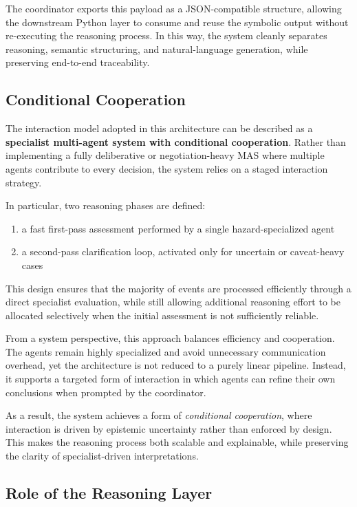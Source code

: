 \documentclass[12pt]{article}
\begin{document}
The coordinator exports this payload as a JSON-compatible structure, allowing the downstream Python layer to consume and reuse the symbolic output without re-executing the reasoning process. In this way, the system cleanly separates reasoning, semantic structuring, and natural-language generation, while preserving end-to-end traceability.

\subsection{Conditional Cooperation}

The interaction model adopted in this architecture can be described as a \textbf{specialist multi-agent system with conditional cooperation}. Rather than implementing a fully deliberative or negotiation-heavy MAS where multiple agents contribute to every decision, the system relies on a staged interaction strategy.

In particular, two reasoning phases are defined:

\begin{enumerate}
\item a fast first-pass assessment performed by a single hazard-specialized agent
\item a second-pass clarification loop, activated only for uncertain or caveat-heavy cases
\end{enumerate}

This design ensures that the majority of events are processed efficiently through a direct specialist evaluation, while still allowing additional reasoning effort to be allocated selectively when the initial assessment is not sufficiently reliable.

From a system perspective, this approach balances efficiency and cooperation. The agents remain highly specialized and avoid unnecessary communication overhead, yet the architecture is not reduced to a purely linear pipeline. Instead, it supports a targeted form of interaction in which agents can refine their own conclusions when prompted by the coordinator.

As a result, the system achieves a form of \emph{conditional cooperation}, where interaction is driven by epistemic uncertainty rather than enforced by design. This makes the reasoning process both scalable and explainable, while preserving the clarity of specialist-driven interpretations.

\subsection{Role of the Reasoning Layer}
\end{document}

